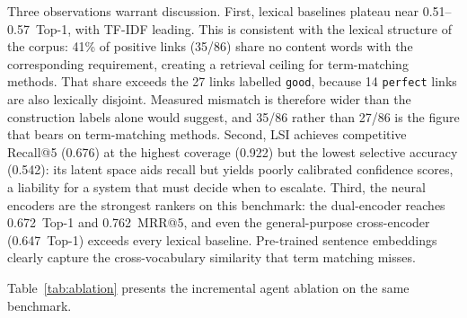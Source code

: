 \documentclass[smallextended,natbib]{svjour3}
\begin{document}
Three observations warrant discussion.
First, lexical baselines plateau near 0.51--0.57~Top-1, with TF-IDF leading.
This is consistent with the lexical structure of the corpus: 41\% of positive links (35/86) share no content words with the corresponding requirement, creating a retrieval ceiling for term-matching methods.
That share exceeds the 27 links labelled \texttt{good}, because 14 \texttt{perfect} links are also lexically disjoint.
Measured mismatch is therefore wider than the construction labels alone would suggest, and 35/86 rather than 27/86 is the figure that bears on term-matching methods.
Second, LSI achieves competitive Recall@5 (0.676) at the highest coverage (0.922) but the lowest selective accuracy (0.542): its latent space aids recall but yields poorly calibrated confidence scores, a liability for a system that must decide when to escalate.
Third, the neural encoders are the strongest rankers on this benchmark: the dual-encoder reaches 0.672~Top-1 and 0.762~MRR@5, and even the general-purpose cross-encoder (0.647~Top-1) exceeds every lexical baseline. Pre-trained sentence embeddings clearly capture the cross-vocabulary similarity that term matching misses.

Table~\ref{tab:ablation} presents the incremental agent ablation on the same benchmark.

\begin{table}[htbp]
\caption{Agent ablation on the diagnostic benchmark. Repeated-holdout protocol, mean $\pm$ 95\% CI over 30 seeds; $\Delta$ is the marginal Top-1 gain over the previous row. Ranking metrics are decision-independent. The coverage and selective-accuracy columns are the reason this table uses holdouts: they need a calibrated threshold. The Top-1 column is descriptive here; Table~\ref{tab:multi} gives the primary figure.}
\label{tab:ablation}
\centering
\setlength{\tabcolsep}{3pt}
\small
{}
\end{table}
\end{document}
